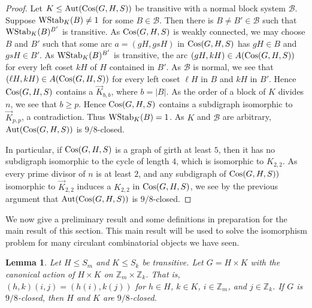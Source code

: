 \documentclass{amsart}
\newtheorem{lem}[thrm]{Lemma}
\theoremstyle{definition}
\theoremstyle{remark}
\numberwithin{equation}{section}
\def\Z{{\mathbb Z}}
\def\Aut{{\rm Aut}}
\def\cal{\mathcal}
\def\WStab{{\rm WStab}}
\def\Cos{{\rm Cos}}
\begin{document}
\begin{proof}
Let $K\le\Aut(\Cos(G,H,S))$ be transitive with a normal block system ${\cal B}$.  Suppose $\WStab_K(B)\not = 1$ for some $B\in{\cal B}$.  Then there is $B\not = B'\in{\cal B}$ such that $\WStab_K(B)^{B'}$ is transitive.  As $\Cos(G,H,S)$ is weakly connected, we may choose $B$ and $B'$ such that some arc $a = (gH,gsH)$ in $\Cos(G,H,S)$ has $gH\in B$ and $gsH\in B'$.  As $\WStab_K(B)^{B'}$ is transitive, the arc $(gH,kH)\in A(\Cos(G,H,S))$ for every left coset $kH$ of $H$ contained in $B'$.  As ${\cal B}$ is normal, we see that $(\ell H,kH)\in A(\Cos(G,H,S))$ for every left coset $\ell H$ in $B$ and $kH$ in $B'$.  Hence $\Cos(G,H,S)$ contains a $\vec{K}_{b,b}$, where $b = \vert B\vert$.  As the order of a block of $K$ divides $n$, we see that $b\ge p$.  Hence $\Cos(G,H,S)$ contains a subdigraph isomorphic to $\vec{K}_{p,p}$, a contradiction.  Thus $\WStab_K(B) = 1$.  As $K$ and ${\cal B}$ are arbitrary, $\Aut(\Cos(G,H,S))$ is $9/8$-closed.

In particular, if $\Cos(G,H,S)$ is a graph of girth at least $5$, then it has no subdigraph isomorphic to the cycle of length $4$, which is isomorphic to $K_{2,2}$.  As every prime divisor of $n$ is at least $2$, and any subdigraph of $\Cos(G,H,S))$ isomorphic to $\vec{K}_{2,2}$ induces a $K_{2,2}$ in $\Cos(G,H,S)$, we see by the previous argument that $\Aut(\Cos(G,H,S))$ is $9/8$-closed.
\end{proof}

We now give a preliminary result and some definitions in preparation for the main result of this section.  This main result will be used to solve the isomorphism problem for many circulant combinatorial objects we have seen.

\begin{lem}\label{product 9/8-closed}
Let $H\le S_m$ and $K\le S_k$ be transitive.  Let $G = H\times K$ with the canonical action of $H\times K$ on $\Z_m\times\Z_k$.  That is, $(h,k)(i,j) = (h(i),k(j))$ for $h\in H$, $k\in K$, $i\in\Z_m$, and $j\in\Z_k$.  If $G$ is $9/8$-closed, then $H$ and $K$ are $9/8$-closed.
\end{lem}
\end{document}
